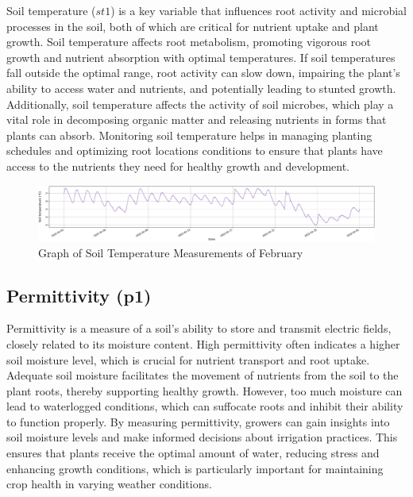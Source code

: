 Soil temperature (\( st1 \)) is a key variable that influences root activity and microbial processes in the soil, both of which are critical for nutrient uptake and plant growth. Soil temperature affects root metabolism, promoting vigorous root growth and nutrient absorption with optimal temperatures. If soil temperatures fall outside the optimal range, root activity can slow down, impairing the plant's ability to access water and nutrients, and potentially leading to stunted growth. Additionally, soil temperature affects the activity of soil microbes, which play a vital role in decomposing organic matter and releasing nutrients in forms that plants can absorb. Monitoring soil temperature helps in managing planting schedules and optimizing root locations conditions to ensure that plants have access to the nutrients they need for healthy growth and development.

\begin{figure}[htbp]
    \centering
    \includegraphics[width=15 cm]{4_ChapterMaterials/figuras/train_data_Soil_temperature.pdf}
    \caption{Graph of Soil Temperature Measurements of February}
    \end{figure}

\subsection{Permittivity (p1)}

Permittivity is a measure of a soil's ability to store and transmit electric fields, closely related to its moisture content. High permittivity often indicates a higher soil moisture level, which is crucial for nutrient transport and root uptake. Adequate soil moisture facilitates the movement of nutrients from the soil to the plant roots, thereby supporting healthy growth. However, too much moisture can lead to waterlogged conditions, which can suffocate roots and inhibit their ability to function properly. By measuring permittivity, growers can gain insights into soil moisture levels and make informed decisions about irrigation practices. This ensures that plants receive the optimal amount of water, reducing stress and enhancing growth conditions, which is particularly important for maintaining crop health in varying weather conditions.

